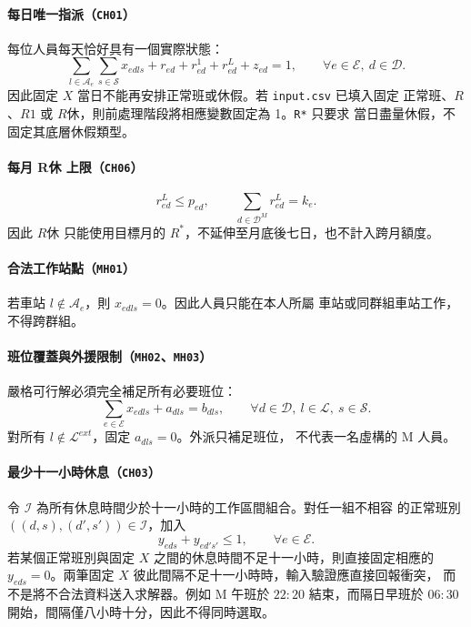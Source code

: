 \documentclass[12pt]{article}
\begin{document}
\paragraph{每日唯一指派（\texttt{CH01}）}

每位人員每天恰好具有一個實際狀態：
\[
  \sum_{l\in\mathcal{A}_e}\sum_{s\in\mathcal{S}}x_{edls}
  +r_{ed}+r^{1}_{ed}+r^{L}_{ed}+z_{ed}=1,
  \qquad
  \forall e\in\mathcal{E},\ d\in\mathcal{D}.
\]
因此固定 \(X\) 當日不能再安排正常班或休假。若 \texttt{input.csv} 已填入固定
正常班、\(R\)、\(R1\) 或 \(R休\)，則前處理階段將相應變數固定為 1。\texttt{R*} 只要求
當日盡量休假，不固定其底層休假類型。

\paragraph{每月 R休 上限（\texttt{CH06}）}

\[
  r^{L}_{ed}\leq p_{ed},
  \qquad
  \sum_{d\in\mathcal D^M}r^{L}_{ed}=k_e.
\]
因此 \(R休\) 只能使用目標月的 \(R^*\)，不延伸至月底後七日，也不計入跨月額度。

\paragraph{合法工作站點（\texttt{MH01}）}

若車站 \(l\notin\mathcal{A}_e\)，則 \(x_{edls}=0\)。因此人員只能在本人所屬
車站或同群組車站工作，不得跨群組。

\paragraph{班位覆蓋與外援限制（\texttt{MH02}、\texttt{MH03}）}

嚴格可行解必須完全補足所有必要班位：
\[
  \sum_{e\in\mathcal{E}}x_{edls}+a_{dls}=b_{dls},
  \qquad
  \forall d\in\mathcal{D},\ l\in\mathcal{L},\ s\in\mathcal{S}.
\]
對所有 \(l\notin\mathcal{L}^{ext}\)，固定 \(a_{dls}=0\)。外派只補足班位，
不代表一名虛構的 M 人員。

\paragraph{最少十一小時休息（\texttt{CH03}）}

令 \(\mathcal{I}\) 為所有休息時間少於十一小時的工作區間組合。對任一組不相容
的正常班別 \(((d,s),(d',s'))\in\mathcal{I}\)，加入
\[
  y_{eds}+y_{ed's'}\leq 1,
  \qquad
  \forall e\in\mathcal{E}.
\]
若某個正常班別與固定 \(X\) 之間的休息時間不足十一小時，則直接固定相應的
\(y_{eds}=0\)。兩筆固定 \(X\) 彼此間隔不足十一小時時，輸入驗證應直接回報衝突，
而不是將不合法資料送入求解器。例如 M 午班於 \(22{:}20\) 結束，而隔日早班於
\(06{:}30\) 開始，間隔僅八小時十分，因此不得同時選取。
\end{document}
